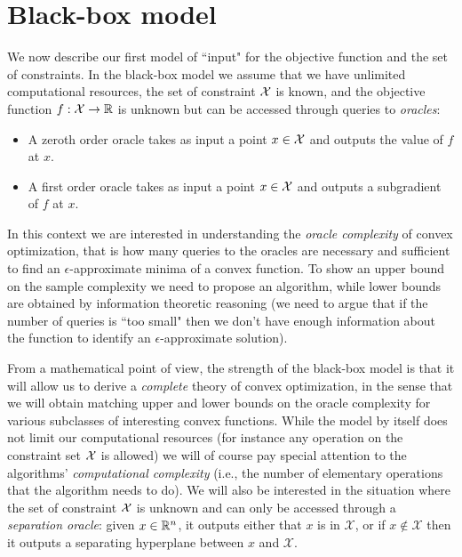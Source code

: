 \section{Black-box model} \label{sec:blackbox}
We now describe our first model of ``input" for the objective function and the set of constraints. In the black-box model we assume that we have unlimited computational resources, the set of constraint $\mathcal{X}$ is known, and the objective function $f: \mathcal{X} \rightarrow \mathbb{R}$ is unknown but can be accessed through queries to {\em oracles}:
\begin{itemize}
\item A zeroth order oracle takes as input a point $x \in \mathcal{X}$ and outputs the value of $f$ at $x$.
\item A first order oracle takes as input a point $x \in \mathcal{X}$ and outputs a subgradient of $f$ at $x$.
\end{itemize}
In this context we are interested in understanding the {\em oracle complexity} of convex optimization, that is how many queries to the oracles are necessary and sufficient to find an $\epsilon$-approximate minima of a convex function. To show an upper bound on the sample complexity we need to propose an algorithm, while lower bounds are obtained by information theoretic reasoning (we need to argue that if the number of queries is ``too small" then we don't have enough information about the function to identify an $\epsilon$-approximate solution).

From a mathematical point of view, the strength of the black-box model is that it will allow us to derive a {\em complete} theory of convex optimization, in the sense that we will obtain matching upper and lower bounds on the oracle complexity for various subclasses of interesting convex functions. While the model by itself does not limit our computational resources (for instance any operation on the constraint set $\mathcal{X}$ is allowed) we will of course pay special attention to the algorithms' {\em computational complexity} (i.e., the number of elementary operations that the algorithm needs to do). We will also be interested in the situation where the set of constraint $\mathcal{X}$ is unknown and can only be accessed through a {\em separation oracle}: given $x \in \mathbb{R}^n$, it outputs either that $x$ is in $\mathcal{X}$, or if $x \not\in \mathcal{X}$ then it outputs a separating hyperplane between $x$ and $\mathcal{X}$. 

